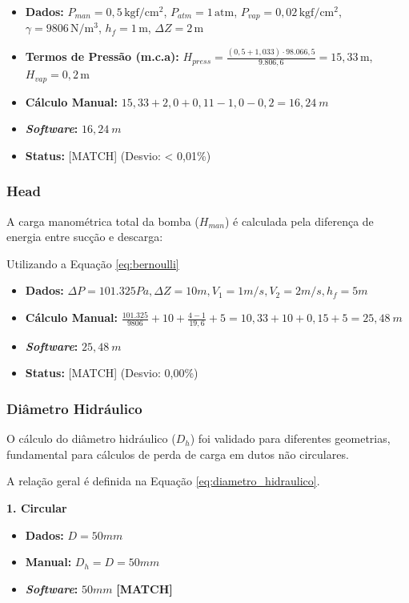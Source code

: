 \begin{itemize}
    \item \textbf{Dados:} $P_{man}=0{,}5\,\mathrm{kgf/cm^2}$, $P_{atm}=1\,\mathrm{atm}$, $P_{vap}=0{,}02\,\mathrm{kgf/cm^2}$, $\gamma=9806\,\mathrm{N/m^3}$, $h_f=1\,\mathrm{m}$, $\Delta Z=2\,\mathrm{m}$
    \item \textbf{Termos de Pressão (m.c.a):} $H_{press} = \frac{(0{,}5+1{,}033) \cdot 98.066{,}5}{9.806{,}6} = 15{,}33\,\mathrm{m}$, $H_{vap} = 0{,}2\,\mathrm{m}$
    \item \textbf{Cálculo Manual:} $15,33 + 2,0 + 0,11 - 1,0 - 0,2 = 16,24 \ m$
    \item \textbf{\textit{Software}:} $16,24 \ m$
    \item \textbf{Status:} [MATCH] (Desvio: < 0,01\%)
\end{itemize}

\subsubsection{Head}
A carga manométrica total da bomba ($H_{man}$) é calculada pela diferença de energia entre sucção e descarga:

\begin{center} Utilizando a Equação \ref{eq:bernoulli} \end{center}

\begin{itemize}
    \item \textbf{Dados:} $\Delta P=101.325 Pa, \Delta Z=10m, V_1=1m/s, V_2=2m/s, h_f=5m$
    \item \textbf{Cálculo Manual:} $\frac{101.325}{9806} + 10 + \frac{4-1}{19,6} + 5 = 10,33 + 10 + 0,15 + 5 = 25,48 \ m$
    \item \textbf{\textit{Software}:} $25,48 \ m$
    \item \textbf{Status:} [MATCH] (Desvio: 0,00\%)
\end{itemize}

\subsubsection{Diâmetro Hidráulico}
O cálculo do diâmetro hidráulico ($D_h$) foi validado para diferentes geometrias, fundamental para cálculos de perda de carga em dutos não circulares.

A relação geral é definida na Equação \ref{eq:diametro_hidraulico}.

\textbf{1. Circular}
\begin{itemize}
    \item \textbf{Dados:} $D=50mm$
    \item \textbf{Manual:} $D_h = D = 50mm$
    \item \textbf{\textit{Software}:} $50mm$ \textbf{[MATCH]}
\end{itemize}

